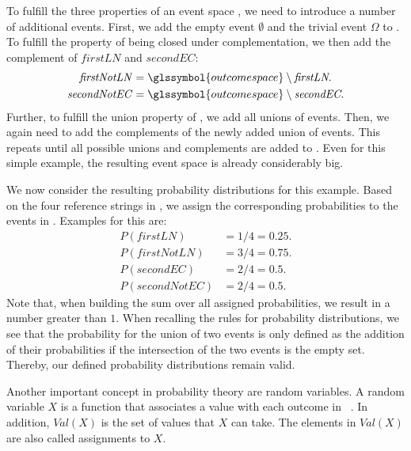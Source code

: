 To fulfill the three properties of an \gls{event space} , we need to introduce a number of additional \glspl{event}.
First, we add the empty \gls{event} $\emptyset$ and the trivial \gls{event} $\Omega$ to .
To fulfill the property of  being closed under complementation, we then add the complement of $\mathit{firstLN}$ and $\mathit{secondEC}$:
\begin{equation*}
  \begin{split}
    \mathit{firstNotLN}&=\glssymbol{outcome space}\setminus\textit{firstLN}.\\
    \mathit{secondNotEC}&=\glssymbol{outcome space}\setminus\textit{secondEC}.\\
  \end{split}
\end{equation*}
Further, to fulfill the union property of , we add all unions of \glspl{event}.
Then, we again need to add the complements of the newly added union of \glspl{event}.
This repeats until all possible unions and complements are added to .
Even for this simple example, the resulting \gls{event space} is already considerably big.

We now consider the resulting \glspl{probability distribution} for this example.
Based on the four reference strings in , we assign the corresponding probabilities to the events in .
Examples for this are:
\begin{equation*}
    \begin{split}
      P(\mathit{firstLN})&=1/4=0.25.\\
      P(\mathit{firstNotLN})&=3/4=0.75.\\
      P(\mathit{secondEC})&=2/4=0.5.\\
      P(\mathit{secondNotEC})&=2/4=0.5.
    \end{split}
\end{equation*}
Note that, when building the sum over all assigned probabilities, we result in a number greater than $1$.
When recalling the rules for \glspl{probability distribution}, we see that the probability for the union of two \glspl{event} is only defined as the addition of their probabilities if the intersection of the two events is the empty set.
Thereby, our defined \glspl{probability distribution} remain valid.

\bigskip

Another important concept in probability theory are \glspl{random variable}.
A \gls{random variable} $X$ is a \gls{function} that associates a value with each outcome in ~\cite{koller2009probabilistic}.
In addition, $\mathit{Val}(X)$ is the set of values that $X$ can take.
The elements in $\mathit{Val}(X)$ are also called \glspl{assignment} to $X$.

